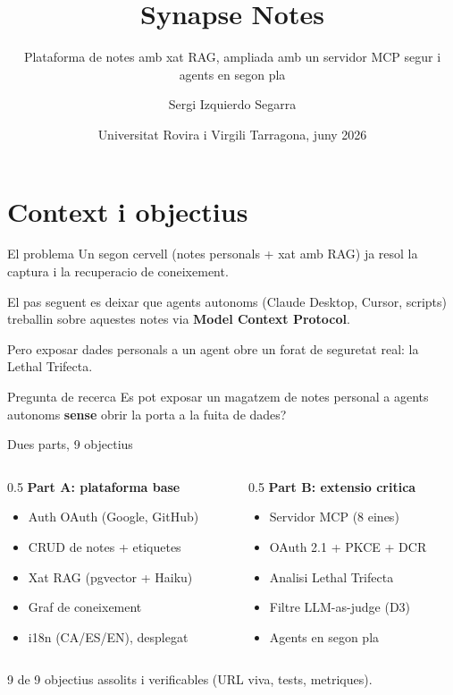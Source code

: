 \documentclass[10pt, aspectratio=169]{beamer}
\title{Synapse Notes}
\subtitle{Plataforma de notes amb xat RAG, ampliada amb un servidor MCP segur i agents en segon pla}
\author{Sergi Izquierdo Segarra}
\institute{Grau en Enginyeria Informatica \quad\textbar\quad Dirigit pel Sr.\ Marc Sanchez}
\date{Universitat Rovira i Virgili \quad\textbar\quad Tarragona, juny 2026}
\begin{document}
\maketitle

\section{Context i objectius}

\begin{frame}{El problema}
  Un \alert{segon cervell} (notes personals + xat amb RAG) ja resol la captura
  i la recuperacio de coneixement.

  \bigskip
  El pas seguent es deixar que \alert{agents autonoms} (Claude Desktop, Cursor,
  scripts) treballin sobre aquestes notes via \textbf{Model Context Protocol}.

  \bigskip
  Pero exposar dades personals a un agent obre un forat de seguretat real:
  la \alert{Lethal Trifecta}.

  \vfill
  \begin{block}{Pregunta de recerca}
    Es pot exposar un magatzem de notes personal a agents autonoms
    \textbf{sense} obrir la porta a la fuita de dades?
  \end{block}
\end{frame}

\begin{frame}{Dues parts, 9 objectius}
  \begin{columns}[T]
    \begin{column}{0.5\textwidth}
      \textbf{Part A: plataforma base}
      \begin{itemize}
        \item Auth OAuth (Google, GitHub)
        \item CRUD de notes + etiquetes
        \item Xat RAG (pgvector + Haiku)
        \item Graf de coneixement
        \item i18n (CA/ES/EN), desplegat
      \end{itemize}
    \end{column}
    \begin{column}{0.5\textwidth}
      \textbf{Part B: extensio critica}
      \begin{itemize}
        \item Servidor MCP (8 eines)
        \item OAuth 2.1 + PKCE + DCR
        \item Analisi Lethal Trifecta
        \item Filtre LLM-as-judge (D3)
        \item Agents en segon pla
      \end{itemize}
    \end{column}
  \end{columns}
  \vfill
  \begin{center}
    \alert{9 de 9 objectius assolits} i verificables (URL viva, tests, metriques).
  \end{center}
\end{frame}
\end{document}
